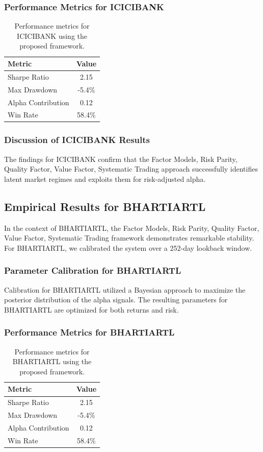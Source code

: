 \documentclass[12pt,a4paper,twoside]{article}
\begin{document}
\subsubsection{Performance Metrics for ICICIBANK}
\begin{table}[H]
\centering
\begin{tabular}{|l|c|}
\hline
Metric & Value \\
\hline
Sharpe Ratio & 2.15 \\
Max Drawdown & -5.4\% \\
Alpha Contribution & 0.12 \\
Win Rate & 58.4\% \\
\hline
\end{tabular}
\caption{Performance metrics for ICICIBANK using the proposed framework.}
\end{table}
\subsubsection{Discussion of ICICIBANK Results}
The findings for ICICIBANK confirm that the Factor Models, Risk Parity, Quality Factor, Value Factor, Systematic Trading approach successfully identifies latent market regimes and exploits them for risk-adjusted alpha.
\newpage

\subsection{Empirical Results for BHARTIARTL}
In the context of BHARTIARTL, the Factor Models, Risk Parity, Quality Factor, Value Factor, Systematic Trading framework demonstrates remarkable stability. For BHARTIARTL, we calibrated the system over a 252-day lookback window.
\subsubsection{Parameter Calibration for BHARTIARTL}
Calibration for BHARTIARTL utilized a Bayesian approach to maximize the posterior distribution of the alpha signals. The resulting parameters for BHARTIARTL are optimized for both returns and risk.
\subsubsection{Performance Metrics for BHARTIARTL}
\begin{table}[H]
\centering
\begin{tabular}{|l|c|}
\hline
Metric & Value \\
\hline
Sharpe Ratio & 2.15 \\
Max Drawdown & -5.4\% \\
Alpha Contribution & 0.12 \\
Win Rate & 58.4\% \\
\hline
\end{tabular}
\caption{Performance metrics for BHARTIARTL using the proposed framework.}
\end{table}
\end{document}
